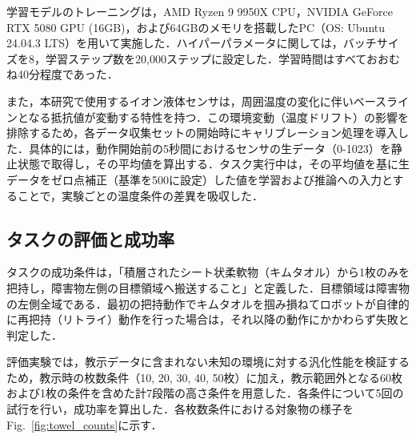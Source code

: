 学習モデルのトレーニングは，AMD Ryzen 9 9950X CPU，NVIDIA GeForce RTX 5080 GPU (16GB)，および64GBのメモリを搭載したPC（OS: Ubuntu 24.04.3 LTS）を用いて実施した．ハイパーパラメータに関しては，バッチサイズを8，学習ステップ数を20,000ステップに設定した．学習時間はすべておおむね40分程度であった．\par

また，本研究で使用するイオン液体センサは，周囲温度の変化に伴いベースラインとなる抵抗値が変動する特性を持つ．この環境変動（温度ドリフト）の影響を排除するため，各データ収集セットの開始時にキャリブレーション処理を導入した．具体的には，動作開始前の5秒間におけるセンサの生データ（0-1023）を静止状態で取得し，その平均値を算出する．タスク実行中は，その平均値を基に生データをゼロ点補正（基準を500に設定）した値を学習および推論への入力とすることで，実験ごとの温度条件の差異を吸収した．\par

\subsection{タスクの評価と成功率}
タスクの成功条件は，「積層されたシート状柔軟物（キムタオル）から1枚のみを把持し，障害物左側の目標領域へ搬送すること」と定義した．目標領域は障害物の左側全域である．最初の把持動作でキムタオルを掴み損ねてロボットが自律的に再把持（リトライ）動作を行った場合は，それ以降の動作にかかわらず失敗と判定した．\par

評価実験では，教示データに含まれない未知の環境に対する汎化性能を検証するため，教示時の枚数条件（10, 20, 30, 40, 50枚）に加え，教示範囲外となる60枚および1枚の条件を含めた計7段階の高さ条件を用意した．各条件について5回の試行を行い，成功率を算出した．各枚数条件における対象物の様子をFig.~\ref{fig:towel_counts}に示す．\par

